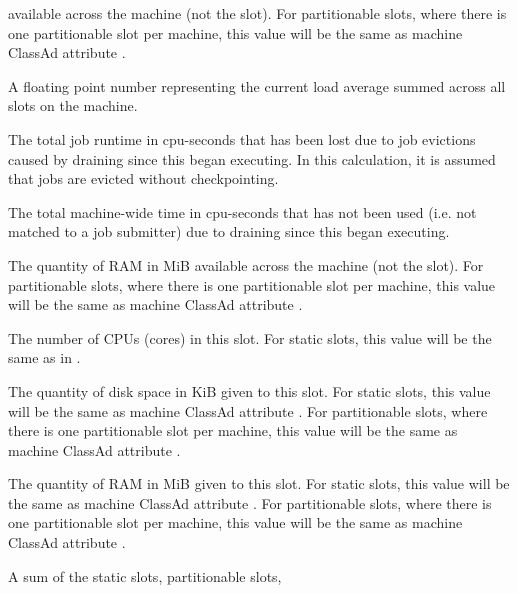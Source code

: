 \begin{description}
available across the machine (not the slot).
For partitionable slots,
where there is one partitionable slot per machine, this value will be
the same as machine ClassAd attribute .
%
\item[\AdAttr{TotalLoadAvg}:] A floating point number representing the 
current load average summed across all slots on the machine.
%
\item[\AdAttr{TotalMachineDrainingBadput}:] The
total job runtime in cpu-seconds that has been lost due to job evictions
caused by draining since this  began executing.  In
this calculation, it is assumed that jobs are evicted without
checkpointing.
%
\item[\AdAttr{TotalMachineDrainingUnclaimedTime}:] The
total machine-wide time in cpu-seconds that has not been used
(i.e. not matched to a job submitter) due to draining since this
 began executing.
%
\item[\AdAttr{TotalMemory}:] The quantity of RAM in MiB
available across the machine (not the slot).
For partitionable slots,
where there is one partitionable slot per machine, this value will be
the same as machine ClassAd attribute .
%
\item[\AdAttr{TotalSlotCpus}:] The number of CPUs (cores) in this slot.
For static slots, this value will be the same as in .
%
\item[\AdAttr{TotalSlotDisk}:] The quantity of disk space in KiB
given to this slot.  For static slots, this value will be the same as
machine ClassAd attribute .  For partitionable slots,
where there is one partitionable slot per machine, this value will be
the same as machine ClassAd attribute .
%
\item[\AdAttr{TotalSlotMemory}:] The quantity of RAM in MiB
given to this slot.  For static slots, this value will be the same as
machine ClassAd attribute .  For partitionable slots,
where there is one partitionable slot per machine, this value will be
the same as machine ClassAd attribute .
%
\item[\AdAttr{TotalSlots}:] A sum of the static slots, partitionable slots,

\end{description}

